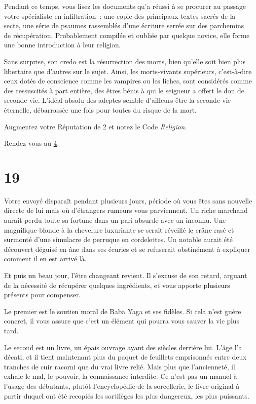 \documentclass{report}
\newcommand{\gsection}[1]{
    \section{#1}
    \label{section-#1}
}
\newcommand{\glink}[1]{\hyperref[section-#1]{#1}}
\begin{document}
Pendant ce temps, vous lisez les documents qu'a réussi à se procurer au passage votre spécialiste en infiltration : une copie des principaux textes sacrés de la secte, une série de psaumes rassemblés d'une écriture serrée sur des parchemins de récupération. Probablement compilée et oubliée par quelque novice, elle forme une bonne introduction à leur religion.

Sans surprise, son credo est la résurrection des morts, bien qu'elle soit bien plus libertaire que d'autres sur le sujet. Ainsi, les morts-vivants supérieurs, c'est-à-dire ceux dotés de conscience comme les vampires ou les liches, sont considérés comme des ressuscités à part entière, des êtres bénis à qui le seigneur a offert le don de seconde vie. L'idéal absolu des adeptes semble d'ailleurs être la seconde vie éternelle, débarrassée une fois pour toutes du risque de la mort.

Augmentez votre Réputation de 2 et notez le Code \emph{Religion}.

Rendez-vous au \glink{4}.

\gsection{19}

Votre envoyé disparaît pendant plusieurs jours, période où vous êtes sans nouvelle directe de lui mais où d'étrangers rumeurs vous parviennent. Un riche marchand aurait perdu toute sa fortune dans un pari absurde avec un inconnu. Une magnifique blonde à la chevelure luxuriante se serait réveillé le crâne rasé et surmonté d'une simulacre de perruque en cordelettes. Un notable aurait été découvert déguisé en âne dans ses écuries et se refuserait obstinément à expliquer comment il en est arrivé là.

Et puis un beau jour, l'être changeant revient. Il s'excuse de son retard, arguant de la nécessité de récupérer quelques ingrédients, et vous apporte plusieurs présents pour compenser.

Le premier est le soutien moral de Baba Yaga et ses fidèles. Si cela n'est guère concret, il vous assure que c'est un élément qui pourra vous sauver la vie plus tard.

Le second est un livre, un épais ouvrage ayant des siècles derrière lui. L'âge l'a décati, et il tient maintenant plus du paquet de feuillets emprisonnés entre deux tranches de cuir racorni que du vrai livre relié. Mais plus que l'ancienneté, il exhale le mal, le pouvoir, la connaissance interdite. Ce n'est pas un manuel à l'usage des débutants, plutôt l'encyclopédie de la sorcellerie, le livre original à partir duquel ont été recopiés les sortilèges les plus dangereux, les plus puissants.
\end{document}
